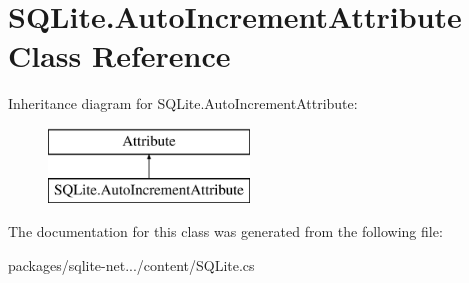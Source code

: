 \hypertarget{classSQLite_1_1AutoIncrementAttribute}{}\section{S\+Q\+Lite.\+Auto\+Increment\+Attribute Class Reference}
\label{classSQLite_1_1AutoIncrementAttribute}
Inheritance diagram for S\+Q\+Lite.\+Auto\+Increment\+Attribute\+:\begin{figure}[H]
\begin{center}
\leavevmode
\includegraphics[height=2.000000cm]{classSQLite_1_1AutoIncrementAttribute}
\end{center}
\end{figure}


The documentation for this class was generated from the following file\+:\begin{DoxyCompactItemize}
\item 
packages/sqlite-\/net.../content/S\+Q\+Lite.\+cs\end{DoxyCompactItemize}
